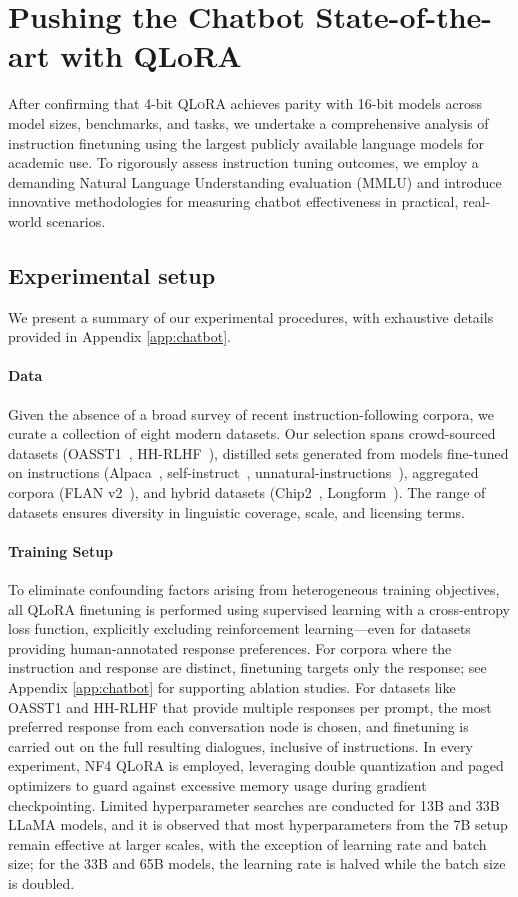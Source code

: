 \section{Pushing the Chatbot State-of-the-art with QLoRA}
\label{sec:pushing}
After confirming that 4-bit \textsc{QLoRA} achieves parity with 16-bit models across model sizes, benchmarks, and tasks, we undertake a comprehensive analysis of instruction finetuning using the largest publicly available language models for academic use. To rigorously assess instruction tuning outcomes, we employ a demanding Natural Language Understanding evaluation (MMLU) and introduce innovative methodologies for measuring chatbot effectiveness in practical, real-world scenarios.

\subsection{Experimental setup}
We present a summary of our experimental procedures, with exhaustive details provided in Appendix \ref{app:chatbot}.

\paragraph{Data}
Given the absence of a broad survey of recent instruction-following corpora, we curate a collection of eight modern datasets. Our selection spans crowd-sourced datasets (OASST1~\citep{kopf2023openassistant}, HH-RLHF~\citep{bai2022training}), distilled sets generated from models fine-tuned on instructions (Alpaca~\citep{alpaca}, self-instruct~\citep{wang2022self}, unnatural-instructions~\citep{honovich2022unnatural}), aggregated corpora (FLAN v2~\citep{chung2022scaling}), and hybrid datasets (Chip2~\citep{laion2023}, Longform~\citep{koksal2023longform}). The range of datasets ensures diversity in linguistic coverage, scale, and licensing terms.

\paragraph{Training Setup}
To eliminate confounding factors arising from heterogeneous training objectives, all QLoRA finetuning is performed using supervised learning with a cross-entropy loss function, explicitly excluding reinforcement learning—even for datasets providing human-annotated response preferences. For corpora where the instruction and response are distinct, finetuning targets only the response; see Appendix \ref{app:chatbot} for supporting ablation studies. For datasets like OASST1 and HH-RLHF that provide multiple responses per prompt, the most preferred response from each conversation node is chosen, and finetuning is carried out on the full resulting dialogues, inclusive of instructions. In every experiment, NF4 \textsc{QLoRA} is employed, leveraging double quantization and paged optimizers to guard against excessive memory usage during gradient checkpointing. Limited hyperparameter searches are conducted for 13B and 33B LLaMA models, and it is observed that most hyperparameters from the 7B setup remain effective at larger scales, with the exception of learning rate and batch size; for the 33B and 65B models, the learning rate is halved while the batch size is doubled.

